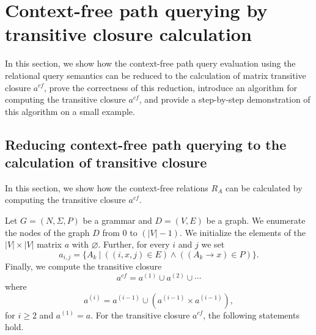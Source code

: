 \section{Context-free path querying by transitive closure calculation}
In this section, we show how the context-free path query evaluation using the relational query semantics can be reduced to the calculation of matrix transitive closure $a^{cf}$, prove the correctness of this reduction, introduce an algorithm for computing the transitive closure $a^{cf}$, and provide a step-by-step demonstration of this algorithm on a small example.

\subsection{Reducing context-free path querying to the calculation of transitive closure} \label{section_reducing}
In this section, we show how the context-free relations $R_A$ can be calculated by computing the transitive closure $a^{cf}$.

Let $G = (N,\Sigma,P)$ be a grammar and $D = (V, E)$ be a graph. We enumerate the nodes of the graph $D$ from 0 to $(|V| - 1)$. We initialize the elements of the $|V| \times |V|$ matrix $a$ with $\varnothing$. Further, for every $i$ and $j$ we set $$a_{i,j} = \{A_k~|~((i,x,j) \in E) \wedge ((A_k \rightarrow x) \in P)\}.$$ Finally, we compute the transitive closure $$a^{cf} = a^{(1)} \cup a^{(2)} \cup \cdots$$ where $$a^{(i)} = a^{(i-1)} \cup (a^{(i-1)} \times a^{(i-1)}),$$ for $i \ge 2$ and $a^{(1)} = a$. For the transitive closure $a^{cf}$, the following statements hold.


